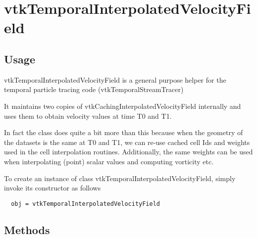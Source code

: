 \section{vtkTemporalInterpolatedVelocityField}

\subsection{Usage}

 vtkTemporalInterpolatedVelocityField is a general purpose
 helper for the temporal particle tracing code (vtkTemporalStreamTracer)

 It maintains two copies of vtkCachingInterpolatedVelocityField internally 
 and uses them to obtain velocity values at time T0 and T1. 

 In fact the class does quite a bit more than this because when the geometry
 of the datasets is the same at T0 and T1, we can re-use cached cell Ids and 
 weights used in the cell interpolation routines.
 Additionally, the same weights can be used when interpolating (point) scalar 
 values and computing vorticity etc.


To create an instance of class vtkTemporalInterpolatedVelocityField, simply
invoke its constructor as follows
\begin{verbatim}
  obj = vtkTemporalInterpolatedVelocityField
\end{verbatim}
\subsection{Methods}

